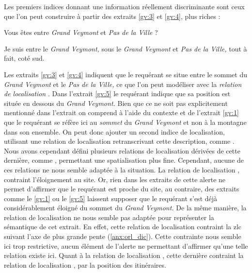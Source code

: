 Les premiers indices donnant une information réellement discriminante
sont ceux que l'on peut construire à partir des extraits \ref{gv:3} et
\ref{gv:4}, plus riches :
%
\begin{dialogue}
  \Sec {} Vous êtes entre \emph{Grand Veymont} et
  \emph{Pas de la Ville} ?

  \Req {} Je suis entre le \emph{Grand Veymont,}
   sous le \emph{Grand Veymont} et \emph{Pas de la
    Ville,} tout à fait,  coté sud.
\end{dialogue}
% 
Les extraits \ref{gv:3} et \ref{gv:4} indiquent que le requérant se
situe entre le sommet du \emph{Grand Veymont} et le \emph{Pas de la
  Ville,} ce que l'on peut modéliser avec la \emph{relation de
  localisation} .
%
Dans l'extrait \ref{gv:5} le requérant indique que sa position est
située en dessous du \emph{Grand Veymont.} Bien que ce ne soit pas
explicitement mentionné dans l'extrait on comprend à l'aide du
contexte et de l'extrait \ref{gv:1} que le requérant se réfère ici au
\emph{sommet} du \emph{Grand Veymont} et non à la montagne dans son
ensemble. On peut donc ajouter un second indice de localisation,
utilisant une relation de localisation retranscrivant cette
description, comme . Nous avons cependant
défini plusieurs relations de localisation dérivées de cette dernière,
comme , permettant une spatialisation plus
fine. Cependant, aucune de ces relations ne nous semble adaptée à la
situation. La relation de localisation ,
contraint l'éloignement au site. Or, rien dans les extraits de cette
alerte ne permet d'affirmer que le requérant est proche du site, au
contraire, des extraits comme le \ref{gv:1} ou le \ref{gv:5} laissent
supposer que le requérant s'est déjà considérablement éloigné du
sommet du \emph{Grand Veymont.} De la même manière, la relation de
localisation  ne nous semble pas
adaptée pour représenter la sémantique de cet extrait. En effet, cette
relation de localisation contraint la \ac{zlc} suivant l'axe de plus
grande pente (\autoref{anx:orl_dic}). Cette contrainte nous semble ici
trop restrictive, aucun élément de l'alerte ne permettant d'affirmer
qu'une telle relation existe ici. Quant à la relation de localisation
, cette dernière contraint la
relation de localisation , par la position
des itinéraires.

